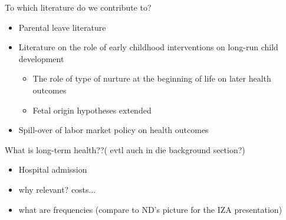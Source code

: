 \documentclass[11pt, a4paper,draft]{article} %
\begin{document}
To which literature do we contribute to?
\begin{itemize}
  \item Parental leave literature
  \item Literature on the role of early childhood interventions on long-run child development
  \begin{itemize}
    \item The role of type of nurture at the beginning of life on later health outcomes
    \item Fetal origin hypotheses extended
  \end{itemize}
  \item Spill-over of labor market policy on health outcomes
\end{itemize}

What is long-term health??( evtl auch in die background section?) 
\begin{itemize}
	\item Hospital admission
	\item why relevant? costs...
	\item what are frequencies (compare to ND's picture for the IZA presentation)
\end{itemize}
\end{document}
